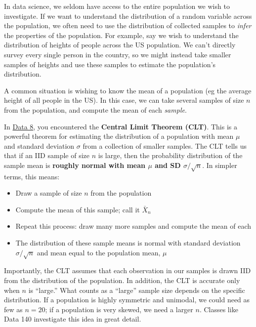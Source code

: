 \documentclass[
  letterpaper,
  DIV=11,
  numbers=noendperiod]{scrreprt}
\providecommand{\tightlist}{%
  \setlength{\itemsep}{0pt}\setlength{\parskip}{0pt}}\usepackage{longtable,booktabs,array}
\begin{document}
In data science, we seldom have access to the entire population we wish
to investigate. If we want to understand the distribution of a random
variable across the population, we often need to use the distribution of
collected samples to \emph{infer} the properties of the population. For
example, say we wish to understand the distribution of heights of people
across the US population. We can't directly survey every single person
in the country, so we might instead take smaller samples of heights and
use these samples to estimate the population's distribution.

A common situation is wishing to know the mean of a population (eg the
average height of all people in the US). In this case, we can take
several samples of size \(n\) from the population, and compute the mean
of each \emph{sample}.

In
\href{https://inferentialthinking.com/chapters/14/4/Central_Limit_Theorem.html?}{Data
8}, you encountered the \textbf{Central Limit Theorem (CLT)}. This is a
powerful theorem for estimating the distribution of a population with
mean \(\mu\) and standard deviation \(\sigma\) from a collection of
smaller samples. The CLT tells us that if an IID sample of size \(n\) is
large, then the probability distribution of the sample mean is
\textbf{roughly normal with mean \(\mu\) and SD \(\sigma/\sqrt{n}\)}. In
simpler terms, this means:

\begin{itemize}
\tightlist
\item
  Draw a sample of size \(n\) from the population
\item
  Compute the mean of this sample; call it \(\bar{X}_n\)
\item
  Repeat this process: draw many more samples and compute the mean of
  each
\item
  The distribution of these sample means is normal with standard
  deviation \(\sigma/\sqrt{n}\) and mean equal to the population mean,
  \(\mu\)
\end{itemize}

Importantly, the CLT assumes that each observation in our samples is
drawn IID from the distribution of the population. In addition, the CLT
is accurate only when \(n\) is ``large.'' What counts as a ``large''
sample size depends on the specific distribution. If a population is
highly symmetric and unimodal, we could need as few as \(n=20\); if a
population is very skewed, we need a larger \(n\). Classes like Data 140
investigate this idea in great detail.
\end{document}
